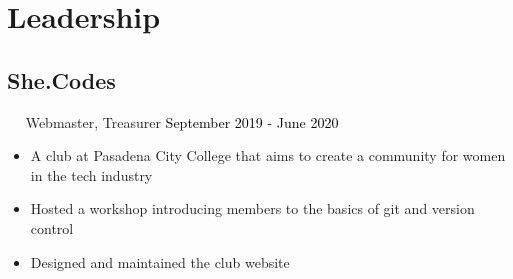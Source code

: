 \documentclass{article}
\newcommand{\resumesection}[3]{
    \subsection*{#1}
    \ 
    \ 
    \small
    \textcolor{csufgrey}{#2}
    \normalsize
    \hfill
    \textcolor{black}{#3}
    \normalsize
}
\begin{document}
\section*{Leadership}
\resumesection{She.Codes}{Webmaster, Treasurer}{September 2019 - June 2020}
\begin{itemize}
    \item A club at Pasadena City College that aims to create a community for women in the tech industry
    \item Hosted a workshop introducing members to the basics of git and version control
    \item Designed and maintained the club website
\end{itemize}
\hfill
\end{document}
